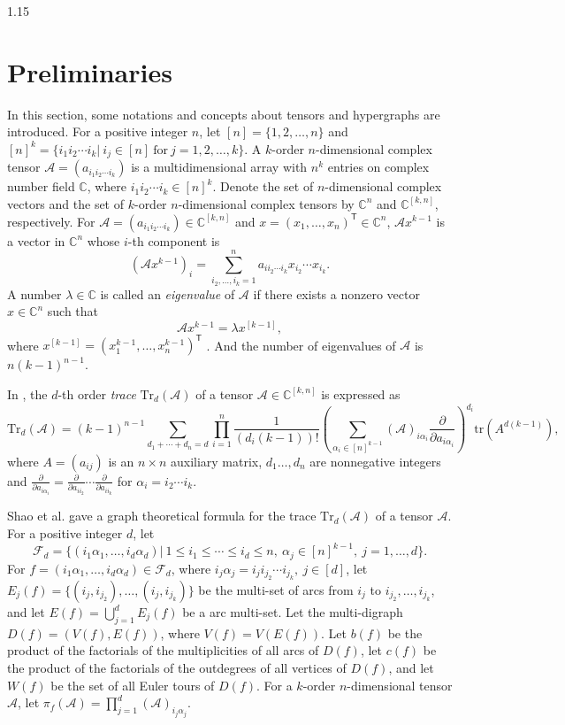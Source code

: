 \documentclass[preprint,12pt]{elsarticle1}
\numberwithin{equation}{section}
\begin{document}
\begin{spacing}{1.15}
\section{Preliminaries}
In this section, some notations and concepts about tensors and hypergraphs are introduced.
For a positive integer $n$, let $[n]=\{1,2,\ldots,n\}$ and $[n]^{k}=\{i_1i_2\cdots i_k|~ i_j\in[n]~ \mathrm{for}~ j=1,2,\ldots,k\}$.
A $k$-order $n$-dimensional complex tensor $\mathcal{A}=(a_{i_1 i_2 \cdots i_k})$ is a multidimensional array with $n^k$ entries on complex number field $\mathbb{C}$, where $i_1i_2\cdots i_k\in[n]^k$.
Denote the set of $n$-dimensional complex vectors and the set of $k$-order $n$-dimensional complex tensors by $\mathbb{C}^{n}$ and $\mathbb{C}^{[k,n]}$, respectively.
For $\mathcal{A}=(a_{i_1 i_2 \cdots i_k})\in\mathbb{C}^{[k,n]}$ and $x=(x_1,\ldots,x_n)^{\mathsf{T}}\in\mathbb{C}^{n}$, $\mathcal{A}x^{k-1}$ is a vector in $\mathbb{C}^{n}$ whose $i$-th component is $$\left( \mathcal{A}x^{k-1} \right)_{i}=\sum\limits_{i_2,\ldots,i_k=1}^{n}a_{i i_2 \cdots i_k}x_{i_2}\cdots x_{i_k}.$$
A number $\lambda\in\mathbb{C}$ is called an \textit{eigenvalue} of $\mathcal{A}$ if there exists a nonzero vector $x\in\mathbb{C}^{n}$ such that $$\mathcal{A}x^{k-1}=\lambda x^{[k-1]},$$ where $x^{[k-1]}=(x_1^{k-1},\ldots,x_n^{k-1})^{\mathsf{T}}$ \cite{ref1,ref2}.
And the number of eigenvalues of $\mathcal{A}$ is $n(k-1)^{n-1}$.

In \cite{ref6}, the $d$-th order \textit{trace} $\mathrm{Tr}_{d}(\mathcal{A})$ of a tensor $\mathcal{A}\in\mathbb{C}^{[k,n]}$ is expressed as
$$\mathrm{Tr}_{d}(\mathcal{A})=(k-1)^{n-1}\sum\limits_{d_1+\cdots+d_n=d}\prod\limits_{i=1}^{n}\frac{1}{(d_i(k-1))!}\left(\sum\limits_{\alpha_i\in[n]^{k-1}}(\mathcal{A})_{i\alpha_i}\frac{\partial}{\partial a_{i\alpha_i}}\right)^{d_{i}}\mathrm{tr}(A^{d(k-1)}),$$
where $A=(a_{ij})$ is an $n\times n$ auxiliary matrix, $d_1\ldots,d_n$ are nonnegative integers and $\frac{\partial}{\partial a_{i\alpha_i}}=\frac{\partial}{\partial a_{i i_2}}\cdots\frac{\partial}{\partial a_{i i_k}}$ for $\alpha_{i}=i_2\cdots i_k$.

Shao et al. \cite{ref8} gave a graph theoretical formula for the trace $\mathrm{Tr}_{d}(\mathcal{A})$ of a tensor $\mathcal{A}$.
For a positive integer $d$, let $$\mathcal{F}_{d}=\{(i_{1}\alpha_{1},\ldots,i_{d}\alpha_{d})|\ 1\le i_{1}\le\cdots\le i_{d}\le n,~ \alpha_{j}\in[n]^{k-1},~ j=1,\ldots,d\}.$$
For $f=(i_{1}\alpha_{1},\ldots,i_{d}\alpha_{d})\in\mathcal{F}_{d}$, where $i_j\alpha_j=i_ji_{j_2}\cdots i_{j_k},~ j\in[d]$,
let $E_{j}(f)=\{(i_j,i_{j_2}),\ldots,(i_j,i_{j_k})\}$ be the multi-set of arcs from $i_j$ to $i_{j_2},\ldots,i_{j_k}$, and let $E(f)=\bigcup_{j=1}^{d}E_j(f)$ be a arc multi-set.
Let the multi-digraph $D(f)=(V(f),E(f))$, where $V(f)=V(E(f))$.
Let $b(f)$ be the product of the factorials of the multiplicities of all arcs of $D(f)$, let $c(f)$ be the product of the factorials of the outdegrees of all vertices of $D(f)$, and let $W(f)$ be the set of all Euler tours of $D(f)$.
For a $k$-order $n$-dimensional tensor $\mathcal{A}$, let $\pi_{f}(\mathcal{A})=\prod_{j=1}^{d} (\mathcal{A})_{i_j\alpha_j}$.


\end{spacing}
\end{document}
